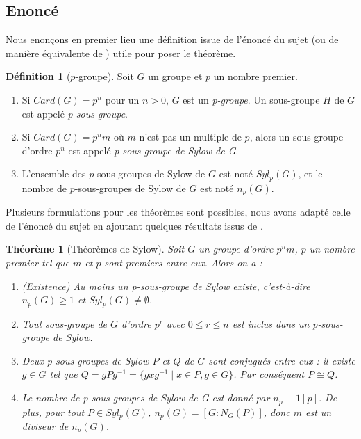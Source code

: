 \documentclass{article}
\theoremstyle{definition}
\newtheorem{definition}[subsubsection]{Définition}
\theoremstyle{plain}
\newtheorem{theorem}[subsubsection]{Théorème}
\theoremstyle{plain}
\theoremstyle{plain}
\theoremstyle{plain}
\theoremstyle{definition}
\theoremstyle{plain}
\theoremstyle{plain}
\begin{document}
\subsection{Enoncé}

\par Nous enonçons en premier lieu une définition issue de l'énoncé du sujet (ou de manière équivalente de \cite[p. ~123 et 139]{dummit2003abstract}) utile pour poser le théorème.

\begin{definition}[\ensuremath{p}-groupe]
	Soit \( G \) un groupe et \( p \) un nombre premier.
	\begin{enumerate}[label = (\roman*)]
	\item Si \( Card(G) = p^{n} \) pour un \( n > 0 \), \( G \) est un \textit{p-groupe}. Un sous-groupe \( H \) de \( G \) est appelé \textit{p-sous groupe}.
	\item Si \( Card(G) = p^{n}m \) où \( m \) n'est pas un multiple de \( p \), alors un sous-groupe d'ordre \( p^{n} \) est appelé \textit{p-sous-groupe de Sylow de G}.
	\item L'ensemble des \(p\)-sous-groupes de Sylow de \( G \) est noté \( Syl_{p}(G) \), et le nombre de \(p\)-sous-groupes de Sylow de \( G \) est noté \( n_{p}(G) \).
	\end{enumerate}
\end{definition}

Plusieurs formulations pour les théorèmes sont possibles, nous avons adapté celle de l'énoncé du sujet en ajoutant quelques résultats issus de \cite[p.~215]{chen2024napkin}.

\begin{theorem}[Théorèmes de Sylow]\label{theorem:S}
	Soit \( G \) un groupe d'ordre \( p^{n}m \), \( p \) un nombre premier tel que \( m \) et \( p \) sont premiers entre eux. Alors on a :
	\begin{enumerate}[label={\upshape(\roman*)}]
		\item (Existence) Au moins un p-sous-groupe de Sylow existe, c'est-à-dire \( n_{p}(G) \geq 1 \) et \( Syl_{p}(G) \neq \emptyset \).\label{S1}
		\item Tout sous-groupe de \( G \) d'ordre \( p^{r} \) avec \( 0 \leq r \leq n \) est inclus dans un p-sous-groupe de Sylow. \label{S2}
		\item Deux p-sous-groupes de Sylow \( P \) et \( Q \) de \( G \) sont conjugués entre eux : il existe \( g \in G \) tel que \( Q = gPg^{-1} = \{ gxg^{-1} \mid x \in P, g \in G \} \). Par conséquent \( P \cong Q \).\label{S3}
		\item Le nombre de p-sous-groupes de Sylow de G est donné par \( n_{p} \equiv 1 [p] \). De plus, pour tout \( P \in Syl_{p}({G}) \), \( n_{p}({G}) = [G : N_{G}({P}) ] \), donc \( m \) est un diviseur de \( n_p({G}) \).\label{S4}
	\end{enumerate}

\end{theorem}
\end{document}

